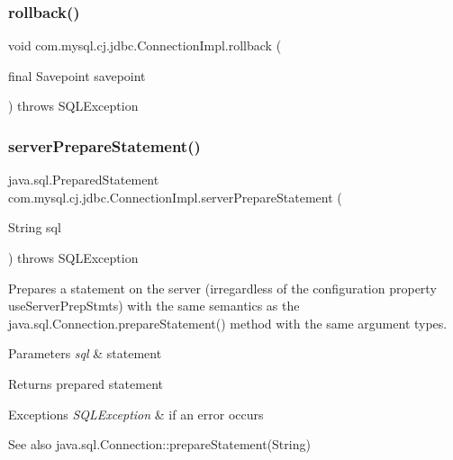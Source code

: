 \subsubsection{\texorpdfstring{rollback()}{rollback()}\hspace{0.1cm}{\footnotesize\ttfamily [2/2]}}
{\footnotesize\ttfamily void com.\+mysql.\+cj.\+jdbc.\+Connection\+Impl.\+rollback (\begin{DoxyParamCaption}\item[{final Savepoint}]{savepoint }\end{DoxyParamCaption}) throws S\+Q\+L\+Exception}

\mbox{\label{classcom_1_1mysql_1_1cj_1_1jdbc_1_1_connection_impl_ad91b5892ca4cc22ca40b2421171b0078}} 
\subsubsection{\texorpdfstring{server\+Prepare\+Statement()}{serverPrepareStatement()}\hspace{0.1cm}{\footnotesize\ttfamily [1/6]}}
{\footnotesize\ttfamily java.\+sql.\+Prepared\+Statement com.\+mysql.\+cj.\+jdbc.\+Connection\+Impl.\+server\+Prepare\+Statement (\begin{DoxyParamCaption}\item[{String}]{sql }\end{DoxyParamCaption}) throws S\+Q\+L\+Exception}

Prepares a statement on the server (irregardless of the configuration property \textquotesingle{}use\+Server\+Prep\+Stmts\textquotesingle{}) with the same semantics as the java.\+sql.\+Connection.\+prepare\+Statement() method with the same argument types.


\begin{DoxyParams}{Parameters}
{\em sql} & statement \\
\hline
\end{DoxyParams}
\begin{DoxyReturn}{Returns}
prepared statement 
\end{DoxyReturn}

\begin{DoxyExceptions}{Exceptions}
{\em S\+Q\+L\+Exception} & if an error occurs \\
\hline
\end{DoxyExceptions}
\begin{DoxySeeAlso}{See also}
java.\+sql.\+Connection\+::prepare\+Statement(\+String) 
\end{DoxySeeAlso}


